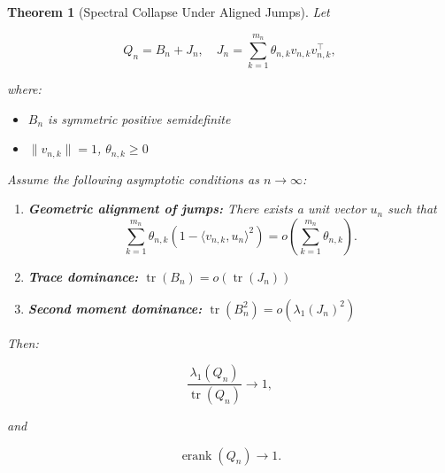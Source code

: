\documentclass[10pt,a4paper]{amsart}
\newtheorem{theorem}{Theorem}
\begin{document}
\begin{theorem}[Spectral Collapse Under Aligned Jumps]
Let

\[
Q_n = B_n + J_n, \quad J_n = \sum_{k=1}^{m_n} \theta_{n,k} v_{n,k} v_{n,k}^\top,
\]

where:
\begin{itemize}
\item \(B_n\) is symmetric positive semidefinite
\item \(\|v_{n,k}\| = 1\), \(\theta_{n,k} \ge 0\)
\end{itemize}

Assume the following asymptotic conditions as \(n \to \infty\):

\begin{enumerate}
\item \textbf{Geometric alignment of jumps:} There exists a unit vector \(u_n\) such that
\[
\sum_{k=1}^{m_n} \theta_{n,k} \left(1 - \langle v_{n,k}, u_n \rangle^2 \right) = o\left(\sum_{k=1}^{m_n} \theta_{n,k}\right).
\]

\item \textbf{Trace dominance:} \(\operatorname{tr}(B_n) = o(\operatorname{tr}(J_n))\)

\item \textbf{Second moment dominance:} \(\operatorname{tr}(B_n^2) = o(\lambda_1(J_n)^2)\)
\end{enumerate}

Then:

\[
\frac{\lambda_1(Q_n)}{\operatorname{tr}(Q_n)} \to 1,
\]

and

\[
\operatorname{erank}(Q_n) \to 1.
\]

\end{theorem}
\end{document}
